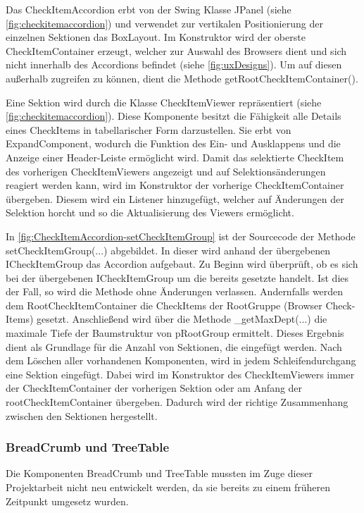Das CheckItemAccordion erbt von der Swing Klasse JPanel (siehe \autoref{fig:checkitemaccordion}) und verwendet zur vertikalen Positionierung der einzelnen Sektionen das BoxLayout. Im Konstruktor wird der oberste CheckItemContainer erzeugt, welcher zur Auswahl des Browsers dient und sich nicht innerhalb des Accordions befindet (siehe \autoref{fig:uxDesigns}). Um auf diesen außerhalb zugreifen zu können, dient die Methode getRootCheckItemContainer().

Eine Sektion wird durch die Klasse CheckItemViewer repräsentiert (siehe \autoref{fig:checkitemaccordion}). Diese Komponente besitzt die Fähigkeit alle Details eines CheckItems in tabellarischer Form darzustellen. Sie erbt von ExpandComponent, wodurch die Funktion des Ein- und Ausklappens und die Anzeige einer Header-Leiste ermöglicht wird. Damit das selektierte CheckItem des vorherigen CheckItemViewers angezeigt und auf Selektionsänderungen reagiert werden kann, wird im Konstruktor der vorherige CheckItemContainer übergeben. Diesem wird ein Listener hinzugefügt, welcher auf Änderungen der Selektion horcht und so die Aktualisierung des Viewers ermöglicht.



In \autoref{fig:CheckItemAccordion-setCheckItemGroup} ist der Sourcecode der Methode setCheckItemGroup(...) abgebildet. In dieser wird anhand der übergebenen ICheckItemGroup das Accordion aufgebaut. Zu Beginn wird überprüft, ob es sich bei der übergebenen ICheckItemGroup um die bereits gesetzte handelt. Ist dies der Fall, so wird die Methode ohne Änderungen verlassen. Andernfalls werden dem RootCheckItemContainer die CheckItems der RootGruppe (Browser Check-Items) gesetzt. Anschließend wird über die Methode \_getMaxDept(...) die maximale Tiefe der Baumstruktur von pRootGroup ermittelt. Dieses Ergebnis dient als Grundlage für die Anzahl von Sektionen, die eingefügt werden. Nach dem Löschen aller vorhandenen Komponenten, wird in jedem Schleifendurchgang eine Sektion eingefügt. Dabei wird im Konstruktor des CheckItemViewers immer der CheckItemContainer der vorherigen Sektion oder am Anfang der rootCheckItemContainer übergeben. Dadurch wird der richtige Zusammenhang zwischen den Sektionen hergestellt.

\subsubsection{BreadCrumb und TreeTable}

Die Komponenten BreadCrumb und TreeTable mussten im Zuge dieser Projektarbeit nicht neu entwickelt werden, da sie bereits zu einem früheren Zeitpunkt umgesetz wurden. 

